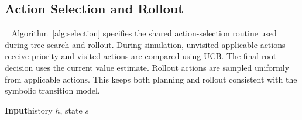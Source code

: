 \subsection{Action Selection and Rollout}~\label{appx:alg_selection}
Algorithm~\ref{alg:selection} specifies the shared action-selection routine used during tree search and rollout. During simulation, unvisited applicable actions receive priority and visited actions are compared using UCB. The final root decision uses the current value estimate. Rollout actions are sampled uniformly from applicable actions. This keeps both planning and rollout consistent with the symbolic transition model.

\begin{algorithm}[H]
\caption{Action Selection and Rollout}
\label{alg:selection}
\textbf{Input}\quad history $h$, state $s$
\BlankLine

    
\BlankLine

\end{algorithm}
